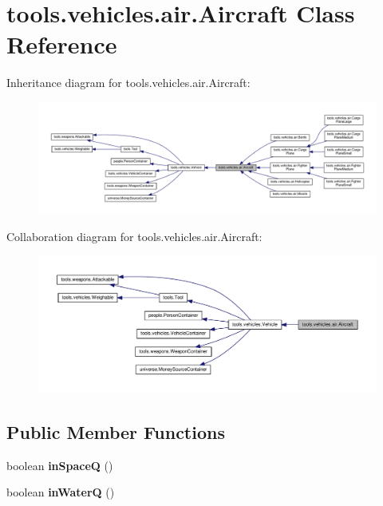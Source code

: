 \hypertarget{classtools_1_1vehicles_1_1air_1_1_aircraft}{}\section{tools.\+vehicles.\+air.\+Aircraft Class Reference}
\label{classtools_1_1vehicles_1_1air_1_1_aircraft}


Inheritance diagram for tools.\+vehicles.\+air.\+Aircraft\+:
\nopagebreak
\begin{figure}[H]
\begin{center}
\leavevmode
\includegraphics[width=350pt]{classtools_1_1vehicles_1_1air_1_1_aircraft__inherit__graph}
\end{center}
\end{figure}


Collaboration diagram for tools.\+vehicles.\+air.\+Aircraft\+:
\nopagebreak
\begin{figure}[H]
\begin{center}
\leavevmode
\includegraphics[width=350pt]{classtools_1_1vehicles_1_1air_1_1_aircraft__coll__graph}
\end{center}
\end{figure}
\subsection*{Public Member Functions}
\begin{DoxyCompactItemize}
\item 
boolean {\bfseries in\+SpaceQ} ()\hypertarget{classtools_1_1vehicles_1_1air_1_1_aircraft_a87552a93d7bff7846b29ce4d260be969}{}\label{classtools_1_1vehicles_1_1air_1_1_aircraft_a87552a93d7bff7846b29ce4d260be969}

\item 
boolean {\bfseries in\+WaterQ} ()\hypertarget{classtools_1_1vehicles_1_1air_1_1_aircraft_a46b97e2a63cea4f622167440f1951242}{}\label{classtools_1_1vehicles_1_1air_1_1_aircraft_a46b97e2a63cea4f622167440f1951242}

\end{DoxyCompactItemize}

